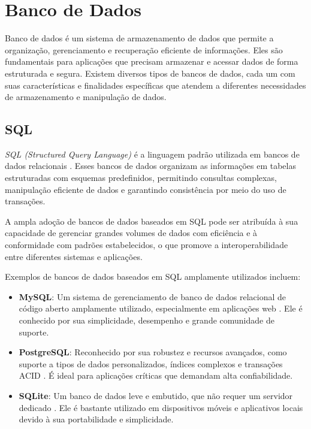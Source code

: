 \section{Banco de Dados}

Banco de dados é um sistema de armazenamento de dados que permite a organização, gerenciamento e recuperação eficiente de informações. Eles são fundamentais para aplicações que precisam armazenar e acessar dados de forma estruturada e segura. Existem diversos tipos de bancos de dados, cada um com suas características e finalidades específicas que atendem a diferentes necessidades de armazenamento e manipulação de dados.


\subsection{SQL}

\emph{SQL (Structured Query Language)} é a linguagem padrão utilizada em bancos de dados relacionais \cite{beaulieu2009sql}. Esses bancos de dados organizam as informações em tabelas estruturadas com esquemas predefinidos, permitindo consultas complexas, manipulação eficiente de dados e garantindo consistência por meio do uso de transações.

A ampla adoção de bancos de dados baseados em SQL pode ser atribuída à sua capacidade de gerenciar grandes volumes de dados com eficiência e à conformidade com padrões estabelecidos, o que promove a interoperabilidade entre diferentes sistemas e aplicações.

Exemplos de bancos de dados baseados em SQL amplamente utilizados incluem:

\begin{itemize}
    \item \textbf{MySQL}: Um sistema de gerenciamento de banco de dados relacional de código aberto amplamente utilizado, especialmente em aplicações web \cite{oracle-mysql}. Ele é conhecido por sua simplicidade, desempenho e grande comunidade de suporte.
    \item \textbf{PostgreSQL}: Reconhecido por sua robustez e recursos avançados, como suporte a tipos de dados personalizados, índices complexos e transações ACID \cite{postgresql}. É ideal para aplicações críticas que demandam alta confiabilidade.
    \item \textbf{SQLite}: Um banco de dados leve e embutido, que não requer um servidor dedicado \cite{sqlite}. Ele é bastante utilizado em dispositivos móveis e aplicativos locais devido à sua portabilidade e simplicidade.
\end{itemize}

